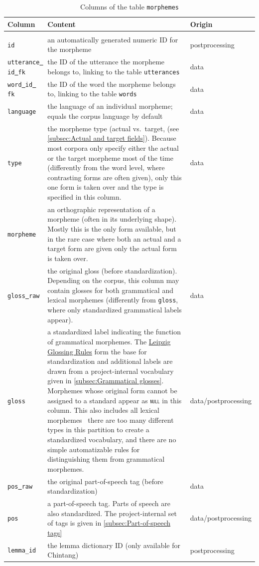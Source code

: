 \documentclass[a4paper, 11pt]{book}
\newcommand{\und}{\underline{{ }}\hspace{0.2mm}}	%
\begin{document}
\begin{longtable}{lp{.5\linewidth}p{.2\linewidth}}
	\toprule
		\textbf{Column} & \textbf{Content} 	& \textbf{Origin} \\
	\midrule
	\endhead
	
	\bottomrule\\[-0.15cm]
	\caption{Columns of the table \texttt{morphemes}}
	\endfoot

		\texttt{id}	 			& an automatically generated numeric ID for the morpheme & postprocessing \\
		\texttt{utterance\und id\und fk} & the ID of the utterance the morpheme belongs to, linking to the table \texttt{utterances} & data \\		
		\texttt{word\und id\und fk} & the ID of the word the morpheme belongs to, linking to the table \texttt{words} & data \\ 
		\texttt{language}	& the language of an individual morpheme; equals the corpus language by default & data \\
		\texttt{type} 			& the morpheme type (actual vs.\ target, (see \autoref{subsec:Actual and target fields}). Because most corpora only
								  specify either the actual or the target morpheme most of the time (differently from the word level, where contrasting forms are often given), only this one form is taken over and the type is specified in this column. & data \\
		\texttt{morpheme} 		& an orthographic representation of a morpheme (often in its underlying shape). Mostly this is the only form available, but in the rare case where both an actual and a target form are given only the actual form is taken over. \\
		\texttt{gloss\und raw} 	& the original gloss (before standardization). Depending on the corpus, this column may contain glosses for both grammatical and lexical morphemes (differently from \texttt{gloss}, where only standardized grammatical labels appear). & data \\
		\texttt{gloss} 			& a standardized label indicating the function of grammatical morphemes. The \href{http://www.eva.mpg.de/lingua/resources/glossing-rules.php}{Leipzig Glossing Rules} form the base for standardization and additional labels are drawn from a project-internal vocabulary given in \autoref{subsec:Grammatical glosses}. Morphemes whose original form cannot be assigned to a standard appear as \texttt{\textsc{null}} in this column. This also includes all lexical morphemes \textendash\ there are too many different types in this partition to create a standardized vocabulary, and there are no simple automatizable rules for distinguishing them from grammatical morphemes. & data/postprocessing \\
		\texttt{pos\und raw} 	& the original part-of-speech tag (before standardization) & data \\		
		\texttt{pos} 			& a part-of-speech tag. Parts of speech are also standardized. The project-internal set of tags is given in \autoref{subsec:Part-of-speech tags} & data/postprocessing \\
		\texttt{lemma\_id} 		& the lemma dictionary ID (only available for Chintang) & postprocessing \\


\end{longtable}
\end{document}

